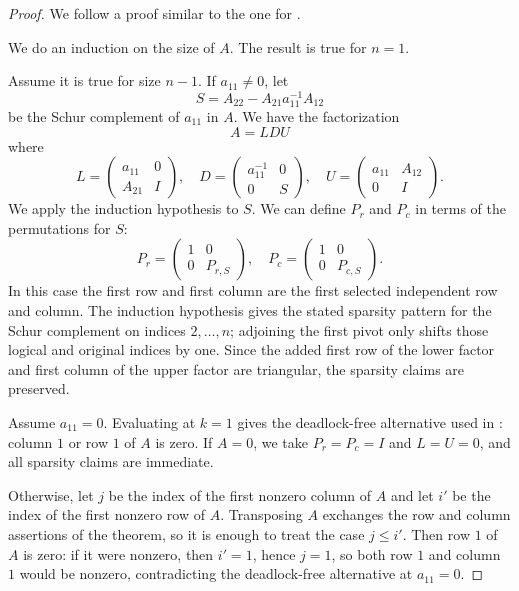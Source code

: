 \documentclass[final]{siamart1116}
\numberwithin{theorem}{section}
\begin{document}
\begin{proof}
  We follow a proof similar to the one for .

  We do an induction on the size of $A$. The result is true for $n=1$.

  Assume it is true for size $n-1$. If $a_{11} \neq 0$, let
  \[
    S = A_{22} - A_{21} a_{11}^{-1} A_{12}
  \]
  be the Schur complement of $a_{11}$ in $A$. We have the factorization
  \[
    A = LDU
  \]
  where
  \[
    L =
    \begin{pmatrix}
      a_{11} & 0 \\
      A_{21} & I
    \end{pmatrix}, \quad
    D =
    \begin{pmatrix}
      a_{11}^{-1} & 0 \\
      0           & S
    \end{pmatrix}, \quad
    U =
    \begin{pmatrix}
      a_{11} & A_{12} \\
      0      & I
    \end{pmatrix}.
  \]
  We apply the induction hypothesis to $S$. We can define $P_r$ and $P_c$ in terms of the permutations for $S$:
  \[ P_r =
    \begin{pmatrix}
      1 & 0       \\
      0 & P_{r,S}
    \end{pmatrix}, \quad
    P_c =
    \begin{pmatrix}
      1 & 0       \\
      0 & P_{c,S}
    \end{pmatrix}.
  \]
  In this case the first row and first column are the first selected independent row and column. The induction hypothesis gives the stated sparsity pattern for the Schur complement on indices $2,\ldots,n$; adjoining the first pivot only shifts those logical and original indices by one. Since the added first row of the lower factor and first column of the upper factor are triangular, the sparsity claims are preserved.

  Assume $a_{11} = 0$. Evaluating  at $k = 1$ gives the deadlock-free alternative used in : column $1$ or row $1$ of $A$ is zero. If $A = 0$, we take $P_r = P_c = I$ and $L = U = 0$, and all sparsity claims are immediate.

  Otherwise, let $j$ be the index of the first nonzero column of $A$ and let $i'$ be the index of the first nonzero row of $A$. Transposing $A$ exchanges the row and column assertions of the theorem, so it is enough to treat the case $j \le i'$. Then row $1$ of $A$ is zero: if it were nonzero, then $i'=1$, hence $j=1$, so both row $1$ and column $1$ would be nonzero, contradicting the deadlock-free alternative at $a_{11}=0$.


\end{proof}
\end{document}
